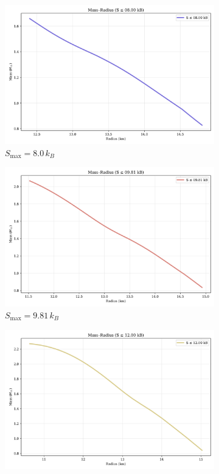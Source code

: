 \documentclass[11pt]{article}
\begin{document}
\begin{figure}[h!]
\centering
\begin{subfigure}[t]{0.32\textwidth}
\includegraphics[width=\textwidth]{mass_radius_curve_08.00kB.png}
\caption{$S_{\max}=8.0\,k_B$}
\end{subfigure}\hfill
\begin{subfigure}[t]{0.32\textwidth}
\includegraphics[width=\textwidth]{mass_radius_curve_09.81kB.png}
\caption{$S_{\max}=9.81\,k_B$}
\end{subfigure}\hfill
\begin{subfigure}[t]{0.32\textwidth}
\includegraphics[width=\textwidth]{mass_radius_curve_12.00kB.png}

\end{subfigure}
\end{figure}
\end{document}
